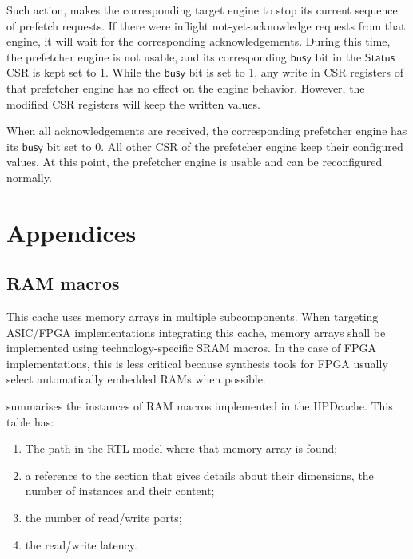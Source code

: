 \documentclass[10pt,titlepage,twoside]{book}
\begin{document}
Such action, makes the corresponding target engine to stop its current sequence of prefetch requests.
If there were inflight not-yet-acknowledge requests from that engine, it will wait for the corresponding acknowledgements.
During this time, the prefetcher engine is not usable, and its corresponding $\mathsf{busy}$ bit in the $\mathsf{Status}$ \ac{CSR} is kept set to 1.
While the $\mathsf{busy}$ bit is set to 1, any write in \ac{CSR} registers of that prefetcher engine has no effect on the engine behavior.
However, the modified \ac{CSR} registers will keep the written values.

When all acknowledgements are received, the corresponding prefetcher engine has its $\mathsf{busy}$ bit set to 0.
All other \ac{CSR} of the prefetcher engine keep their configured values.
At this point, the prefetcher engine is usable and can be reconfigured normally.

%
%
\appendix

\chapter{Appendices}
\minitoc
\newpage

\section{RAM macros}

This cache uses memory arrays in multiple subcomponents.
When targeting \acs{ASIC}/\acs{FPGA} implementations integrating this cache, memory arrays shall be implemented using technology-specific \acs{SRAM} macros.
In the case of \acs{FPGA} implementations, this is less critical because synthesis tools for \acs{FPGA} usually select automatically embedded RAMs when possible.

 summarises the instances of RAM macros implemented in the \ac{HPDcache}.
This table has:
\begin{enumerate}
\item The path in the RTL model where that memory array is found;
\item a reference to the section that gives details about their dimensions, the number of instances and their content;
\item the number of read/write ports;
\item the read/write latency.
\end{enumerate}
\end{document}
